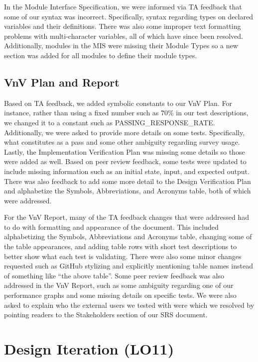 \documentclass{article}
\begin{document}
In the Module Interface Specification, we were informed via TA feedback that some of our syntax
was incorrect. Specifically, syntax regarding types on declared variables and their definitions.
There was also some improper text formatting problems with multi-character variables, all of which
have since been resolved. Additionally, modules in the MIS were missing their Module Types so a new
section was added for all modules to define their module types.

\subsection{VnV Plan and Report}

Based on TA feedback, we added symbolic constants to our VnV Plan. For instance, rather than
using a fixed number such as 70\% in our test descriptions, we changed it to a constant such
as PASSING\_RESPONSE\_RATE. Additionally, we were asked to provide more details on some tests. Specifically,
what constitutes as a pass and some other ambiguity regarding survey usage. Lastly, the
Implementation Verification Plan was missing some details so those were added as well. Based on peer review feedback,
some tests were updated to include missing information such as an initial state, input, and expected output.
There was also feedback to add some more detail to the Design Verification Plan and alphabetize the Symbols,
Abbreviations, and Acronyms table, both of which were addressed.

For the VnV Report, many of the TA feedback changes that were addressed had to do with formatting and
appearance of the document. This included alphabetizing the Symbols, Abbreviations and Acronyms table,
changing some of the table appearances, and adding table rows with short test descriptions to better show
what each test is validating. There were also some minor changes requested such as GitHub stylizing and
explicitly mentioning table names instead of something like ``the above table''. Some peer review feedback
was also addressed in the VnV Report, such as some ambiguity regarding one of our performance graphs and some
missing details on specific tests. We were also asked to explain who the external users we tested with were which
we resolved by pointing readers to the Stakeholders section of our SRS document.

\section{Design Iteration (LO11)}
\end{document}

